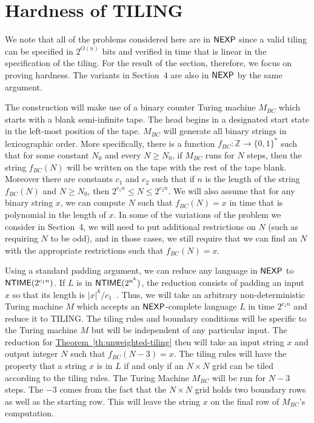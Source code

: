 \documentclass[10pt]{article}
\theoremstyle{definition}
\numberwithin{equation}{section}
\newcommand{\expref}[2]{\texorpdfstring{\hyperref[#2]{#1~\ref{#2}}}{#1~\ref{#2}}}
\newcommand{\NEXP}{{\sf{NEXP}}}
\newcommand{\NTIME}{{\sf{NTIME}}}
\newcommand{\tiling}{TILING}
\begin{document}
\section{Hardness of \tiling}
\label{sec:tiling}

We note that all of the problems
considered here are in $\NEXP$ since a valid tiling can be specified in
$2^{O(n)}$ bits and verified in time that is linear in the specification of the tiling.
For the result of the section, therefore, we focus on proving hardness.
The variants in Section~4 are also in $\NEXP$ by the same argument.

The construction will make use of a
binary counter Turing machine $M_{BC}$
which
starts with a blank semi-infinite tape. The head begins in a designated start
state in the left-most position of the tape. $M_{BC}$ will generate all
binary strings in lexicographic order. More specifically, there is a
function $f_{BC}: \mathbb{Z} \rightarrow \{0,1\}^*$ such that for some
constant $N_0$ and
every $N \ge N_0$, if $M_{BC}$ runs for $N$ steps, then the string $f_{BC}(N)$
will be written on the tape with the rest of the tape blank.
Moreover there are constants $c_1$ and $c_2$ such that
if $n$ is the length of the string $f_{BC}(N)$ and
$N \ge N_0$, then
$2^{c_1 n} \le N \le 2^{c_2 n}$.
We will also assume that for any binary string $x$, we can compute $N$
such that $f_{BC}(N) = x$ in time that is polynomial in the length of $x$.  In some of the variations of the problem we consider in
Section~4, we will need to put additional restrictions on $N$ (such as requiring $N$ to be odd), and in those cases, we still require
that we can find an $N$ with the appropriate restrictions such that $f_{BC}(N) = x$.

Using a standard padding argument, we can reduce any language in
$\NEXP$ to $\NTIME(2^{c_1 n})$. If $L$ is in $\NTIME(2^{n^k})$, the reduction
consists of padding an input $x$ so that its length is $|x|^k/c_1$~\cite{papa95}.
Thus, we will take an arbitrary non-deterministic Turing machine $M$ which accepts
an $\NEXP$-complete language $L$ in time $2^{c_1 n}$ and reduce it to \tiling.
The tiling rules and boundary conditions
will be specific to the Turing machine $M$ but will be independent
of any particular input. The reduction for \expref{Theorem}{th:unweighted-tiling}
then will take an input string $x$ and output
integer $N$ such that $f_{BC}(N-3)=x$. The tiling rules will have the property that
a string $x$ is in $L$ if and only if an $N \times N$ grid can be tiled according
to the tiling rules.
The Turing Machine $M_{BC}$ will be run for $N-3$ steps.
The $-3$ comes from the fact that the $N \times N$ grid holds two boundary rows as well
as the starting row.  This will leave the string $x$ on the final row of $M_{BC}$'s
computation.
\end{document}
